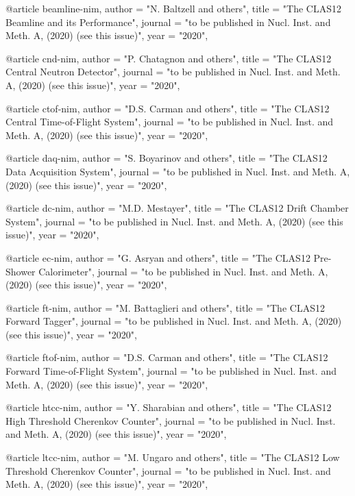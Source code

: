 @article{
beamline-nim,
author         = "N. Baltzell and others",
title          = "{The CLAS12 Beamline and its Performance}",
journal        = "to be published in Nucl. Inst. and Meth. A, (2020) (see this issue)",
year           = "2020",
}

@article{
cnd-nim,
author         = "P. Chatagnon and others",
title          = "{The CLAS12 Central Neutron Detector}",
journal        = "to be published in Nucl. Inst. and Meth. A, (2020) (see this issue)",
year           = "2020",
}

@article{
ctof-nim,
author         = "D.S. Carman and others",
title          = "{The CLAS12 Central Time-of-Flight System}",
journal        = "to be published in Nucl. Inst. and Meth. A, (2020) (see this issue)",
year           = "2020",
}

@article{
daq-nim,
author         = "S. Boyarinov and others",
title          = "{The CLAS12 Data Acquisition System}",
journal        = "to be published in Nucl. Inst. and Meth. A, (2020) (see this issue)",
year           = "2020",
}

@article{
dc-nim,
author         = "M.D. Mestayer",
title          = "{The CLAS12 Drift Chamber System}",
journal        = "to be published in Nucl. Inst. and Meth. A, (2020) (see this issue)",
year           = "2020",
}

@article{
ec-nim,
author         = "G. Asryan and others",
title          = "{The CLAS12 Pre-Shower Calorimeter}",
journal        = "to be published in Nucl. Inst. and Meth. A, (2020) (see this issue)",
year           = "2020",
}

@article{
ft-nim,
author         = "M. Battaglieri and others",
title          = "{The CLAS12 Forward Tagger}",
journal        = "to be published in Nucl. Inst. and Meth. A, (2020) (see this issue)",
year           = "2020",
}

@article{
ftof-nim,
author         = "D.S. Carman and others",
title          = "{The CLAS12 Forward Time-of-Flight System}",
journal        = "to be published in Nucl. Inst. and Meth. A, (2020) (see this issue)",
year           = "2020",
}

@article{
htcc-nim,
author         = "Y. Sharabian and others",
title          = "{The CLAS12 High Threshold Cherenkov Counter}",
journal        = "to be published in Nucl. Inst. and Meth. A, (2020) (see this issue)",
year           = "2020",
}

@article{
ltcc-nim,
author         = "M. Ungaro and others",
title          = "{The CLAS12 Low Threshold Cherenkov Counter}",
journal        = "to be published in Nucl. Inst. and Meth. A, (2020) (see this issue)",
year           = "2020",
}

